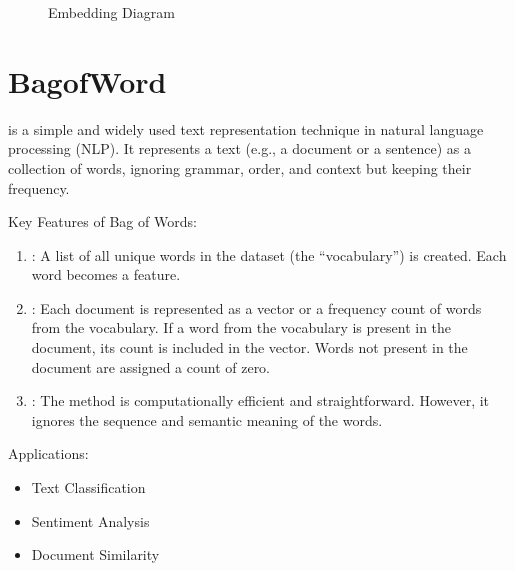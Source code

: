 \documentclass[letterpaper,11pt,english]{sphinxmanual}
\begin{document}
\begin{figure}[htbp]
\centering
\capstart

\noindent{}
\caption{Embedding Diagram}\label{\detokenize{embedding:id1}}\label{\detokenize{embedding:fig-embedding}}\end{figure}


\section{Bag\sphinxhyphen{}of\sphinxhyphen{}Word}
\label{\detokenize{embedding:bag-of-word}}
\sphinxAtStartPar
{} is a simple and widely used text representation technique in natural language processing (NLP). It represents a text (e.g., a document or a sentence) as a collection of words, ignoring grammar, order, and context but keeping their frequency.

\sphinxAtStartPar
Key Features of Bag of Words:
\begin{enumerate}
%
\item {} 
\sphinxAtStartPar
{}:
\sphinxhyphen{} A list of all unique words in the dataset (the “vocabulary”) is created.
\sphinxhyphen{} Each word becomes a feature.

\item {} 
\sphinxAtStartPar
{}:
\sphinxhyphen{} Each document is represented as a vector or a frequency count of words from the vocabulary.
\sphinxhyphen{} If a word from the vocabulary is present in the document, its count is included in the vector.
\sphinxhyphen{} Words not present in the document are assigned a count of zero.

\item {} 
\sphinxAtStartPar
{}:
\sphinxhyphen{} The method is computationally efficient and straightforward.
\sphinxhyphen{} However, it ignores the sequence and semantic meaning of the words.

\end{enumerate}

\sphinxAtStartPar
Applications:
\begin{itemize}
\item {} 
\sphinxAtStartPar
Text Classification

\item {} 
\sphinxAtStartPar
Sentiment Analysis

\item {} 
\sphinxAtStartPar
Document Similarity

\end{itemize}
\end{document}
